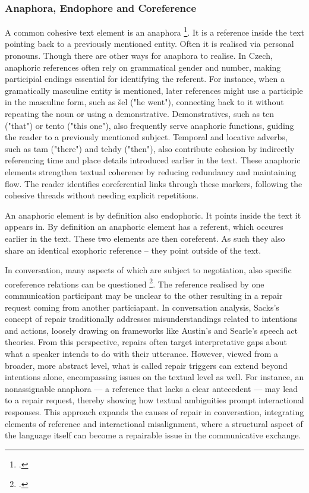\documentclass[12pt]{report}
\begin{document}
{\subsubsection{Anaphora, Endophore and Coreference}
\par
    A common cohesive text element is an anaphora \footcite{Nedoluzhko2010}.
    It is a reference inside the text pointing back to a previously mentioned entity.
    Often it is realised via personal pronouns.
    Though there are other ways for anaphora to realise.
    In Czech, anaphoric references often rely on grammatical gender and number,
    making participial endings essential for identifying the referent.
    For instance, when a gramatically masculine entity is mentioned,
    later references might use a participle in the masculine form, such as šel ("he went"),
    connecting back to it without repeating the noun or using a demonstrative.
    Demonstratives, such as ten ("that") or tento ("this one"),
    also frequently serve anaphoric functions, guiding the reader to a previously mentioned subject.
    Temporal and locative adverbs, such as tam ("there") and tehdy ("then"),
    also contribute cohesion by indirectly referencing time and place details introduced earlier in the text.
    These anaphoric elements strengthen textual coherence by reducing redundancy and maintaining flow.
    The reader identifies coreferential links through these markers,
    following the cohesive threads without needing explicit repetitions.

\par
    An anaphoric element is by definition also endophoric.
    It points inside the text it appears in.
    By definition an anaphoric element has a referent, which occures earlier in the text.
    These two elements are then coreferent.
    As such they also share an identical exophoric reference – they point outside of the text.

\par
    In conversation, many aspects of which are subject to negotiation,
    also specific coreference relations can be questioned \footcite{loaiciga2021reference}.
    The reference realised by one communication participant may be unclear to the other
    resulting in a repair request coming from another particiapant.
    In conversation analysis,
    Sacks’s concept of repair traditionally addresses
    misunderstandings related to intentions and actions,
    loosely drawing on frameworks like Austin’s and Searle’s speech act theories.
    From this perspective, repairs often target interpretative gaps about
    what a speaker intends to do with their utterance.
    However, viewed from a broader, more abstract level,
    what is called repair triggers can extend beyond intentions alone,
    encompassing issues on the textual level as well.
    For instance, an nonassignable anaphora —
    a reference that lacks a clear antecedent —
    may lead to a repair request,
    thereby showing how textual ambiguities prompt interactional responses.
    This approach expands the causes of repair in conversation,
    integrating elements of reference and interactional misalignment,
    where a structural aspect of the language itself can
    become a repairable issue in the communicative exchange.

}
\end{document}
